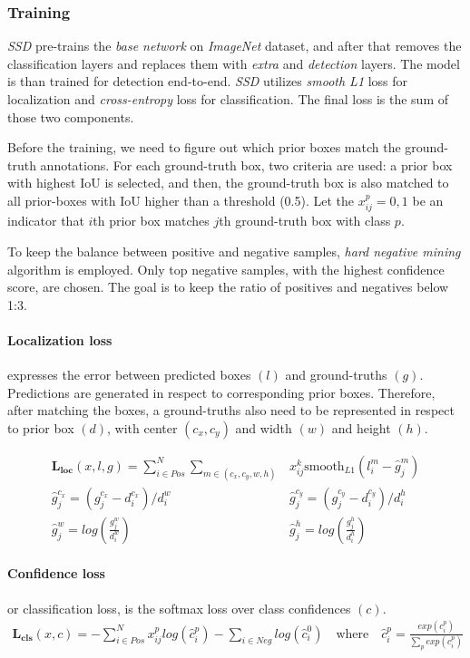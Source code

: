 \subsubsection{Training}
\textit{SSD} pre-trains the \textit{base network} on \textit{ImageNet} dataset, and after that removes the classification layers and replaces them with \textit{extra} and \textit{detection} layers. The model is than trained for detection end-to-end. \textit{SSD} utilizes \textit{smooth L1} loss for localization and \textit{cross-entropy} loss for classification. The final loss is the sum of those two components.

Before the training, we need to figure out which prior boxes match the ground-truth annotations. For each ground-truth box, two criteria are used: a prior box with highest IoU is selected, and then, the ground-truth box is also matched to all prior-boxes with IoU higher than a threshold (0.5). Let the $x_{ij}^p = {0,1}$ be an indicator that $i$th prior box matches $j$th ground-truth box with class $p$.

To keep the balance between positive and negative samples, \textit{hard negative mining} algorithm is employed. Only top negative samples, with the highest confidence score, are chosen. The goal is to keep the ratio of positives and negatives below 1:3.

\paragraph{Localization loss} expresses the error between predicted boxes $(l)$ and ground-truths $(g)$. Predictions are generated in respect to corresponding prior boxes. Therefore, after matching the boxes, a ground-truths also need to be represented in respect to prior box $(d)$, with center $(c_x,c_y)$ and width $(w)$ and height $(h)$.

\begin{align*}
\mathbf{L_{\text{loc}}}(x,l,g) = \sum_{i\in Pos}^N \sum_{m\in(c_x, c_y, w, h)} &x_{ij}^k\text{smooth}_{L1}(l_i^m-\hat{g}_j^m) \\
\hat{g}_j^{c_x} = (g_j^{c_x} - d_i^{c_x}) / d_i^{w} \qquad& \hat{g}_j^{c_y} = (g_j^{c_y} - d_i^{c_y}) / d_i^{h} \\
\hat{g}_j^{w} = log(\frac{g_j^{w}}{d_i^w}) \qquad& \hat{g}_j^{h} = log(\frac{g_j^{h}}{d_i^h})
\end{align*}

\paragraph{Confidence loss} or classification loss, is the softmax loss over class confidences $(c)$.
\begin{align*}
\mathbf{L_{\text{cls}}}(x,c) = -\sum_{i\in Pos}^N x_{ij}^p log(\hat{c}_i^p) - \sum_{i \in Neg} log(\hat{c}_i^0) \quad\text{where} \quad\hat{c}_i^p = \frac{exp(c_i^p)}{\sum_p exp(c_i^p)}
\end{align*}

